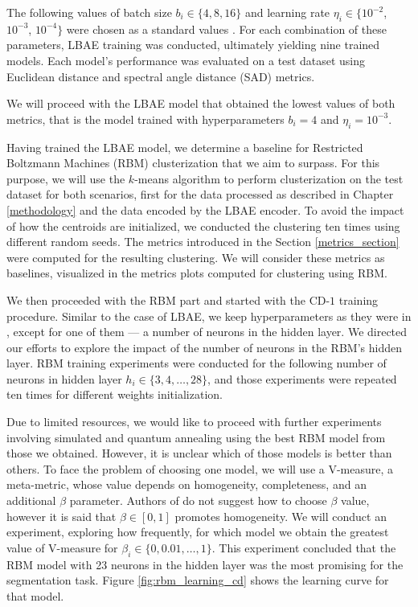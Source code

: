 \documentclass[a4paper,12pt]{article}
\begin{document}
The following values of batch size $b_i \in \{4, 8, 16\}$ and learning rate $\eta_i \in \{10^{-2}$, $10^{-3}$, $10^{-4}\}$ were chosen as a standard values \cite{raschka2019}. For each combination of these parameters, LBAE training was conducted, ultimately yielding nine trained models. Each model's performance was evaluated on a test dataset using Euclidean distance and spectral angle distance (SAD) metrics.

\noindent We will proceed with the LBAE model that obtained the lowest values of both metrics, that is the model trained with hyperparameters $b_i=4$ and $\eta_i=10^{-3}$.

Having trained the LBAE model, we determine a baseline for Restricted Boltzmann Machines (RBM) clusterization that we aim to surpass. For this purpose, we will use the $k$-means algorithm to perform clusterization on the test dataset for both scenarios, first for the data processed as described in Chapter \ref{methodology} and the data encoded by the LBAE encoder. To avoid the impact of how the centroids are initialized, we conducted the clustering ten times using different random seeds. The metrics introduced in the Section \ref{metrics_section} were computed for the resulting clustering. We will consider these metrics as baselines, visualized in the metrics plots computed for clustering using RBM.

We then proceeded with the RBM part and started with the CD-$1$ training procedure. Similar to the case of LBAE, we keep hyperparameters as they were in \cite{QBM4EO}, except for one of them --- a number of neurons in the hidden layer. We directed our efforts to explore the impact of the number of neurons in the RBM's hidden layer. RBM training experiments were conducted for the following number of neurons in hidden layer $h_i \in \{3, 4, \ldots, 28\}$, and those experiments were repeated ten times for different weights initialization.

Due to limited resources, we would like to proceed with further experiments involving simulated and quantum annealing using the best RBM model from those we obtained. However, it is unclear which of those models is better than others. To face the problem of choosing one model, we will use a V-measure, a meta-metric, whose value depends on homogeneity, completeness, and an additional $\beta$ parameter. Authors of \cite{Rosenberg2007} do not suggest how to choose $\beta$ value, however it is said that $\beta \in [0,1]$ promotes homogeneity. We will conduct an experiment, exploring how frequently, for which model we obtain the greatest value of V-measure for $\beta_i \in \{0, 0.01, \ldots, 1\}$. This experiment concluded that the RBM model with 23 neurons in the hidden layer was the most promising for the segmentation task. Figure \ref{fig:rbm_learning_cd} shows the learning curve for that model.
\end{document}
